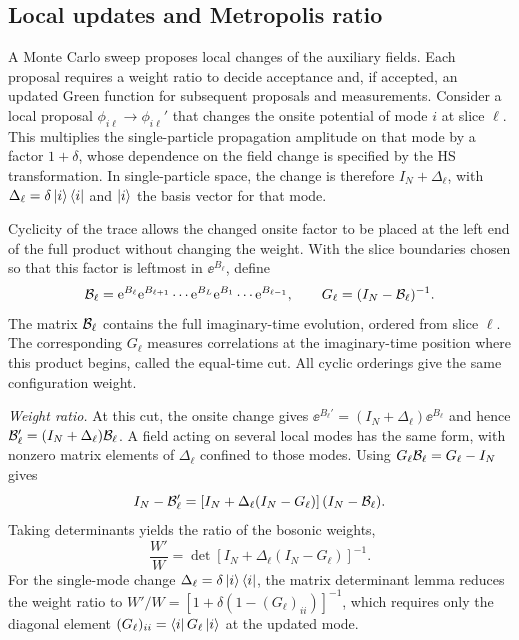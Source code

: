 \subsection{Local updates and Metropolis ratio}
\label{app:update_number}

A Monte Carlo sweep proposes local changes of the auxiliary fields. Each proposal requires a weight ratio to decide acceptance and, if accepted, an updated Green function for subsequent proposals and measurements. Consider a local proposal $\phi_{i\ell}\to\phi_{i\ell}'$ that changes the onsite potential of mode $i$ at slice $\ell$. This multiplies the single-particle propagation amplitude on that mode by a factor $1+\delta$, whose dependence on the field change is specified by the HS transformation. In single-particle space, the change is therefore $I_N+\Delta_\ell$, with $\Delta_\ell=\delta\ket{i}\bra{i}$ and $\ket{i}$ the basis vector for that mode.

Cyclicity of the trace allows the changed onsite factor to be placed at the left end of the full product without changing the weight. With the slice boundaries chosen so that this factor is leftmost in $\ee^{B_\ell}$, define
\begin{equation}
    \mathcal{B}_\ell=\mathrm{e}^{B_\ell}\mathrm{e}^{B_{\ell+1}}\cdots\mathrm{e}^{B_L}\mathrm{e}^{B_1}\cdots\mathrm{e}^{B_{\ell-1}},
    \qquad
    G_\ell=(I_N-\mathcal{B}_\ell)^{-1}.
\end{equation}
The matrix $\mathcal{B}_\ell$ contains the full imaginary-time evolution, ordered from slice $\ell$. The corresponding $G_\ell$ measures correlations at the imaginary-time position where this product begins, called the equal-time cut. All cyclic orderings give the same configuration weight.

\emph{Weight ratio.} At this cut, the onsite change gives $\ee^{B_\ell'}=(I_N+\Delta_\ell)\ee^{B_\ell}$ and hence $\mathcal{B}_\ell'=(I_N+\Delta_\ell)\mathcal{B}_\ell$. A field acting on several local modes has the same form, with nonzero matrix elements of $\Delta_\ell$ confined to those modes. Using $G_\ell\mathcal{B}_\ell=G_\ell-I_N$ gives
\begin{equation}
    I_N-\mathcal{B}_\ell'
    =\left[I_N+\Delta_\ell(I_N-G_\ell)\right](I_N-\mathcal{B}_\ell).
\end{equation}
Taking determinants yields the ratio of the bosonic weights,
\begin{equation}
    \frac{W'}{W}
    =\det\!\left[I_N+\Delta_\ell(I_N-G_\ell)\right]^{-1}.
    \label{eq:update_ratio_number}
\end{equation}
For the single-mode change $\Delta_\ell=\delta\ket{i}\bra{i}$, the matrix determinant lemma reduces the weight ratio to $W'/W=[1+\delta(1-(G_\ell)_{ii})]^{-1}$, which requires only the diagonal element $(G_\ell)_{ii}=\bra{i}G_\ell\ket{i}$ at the updated mode.

